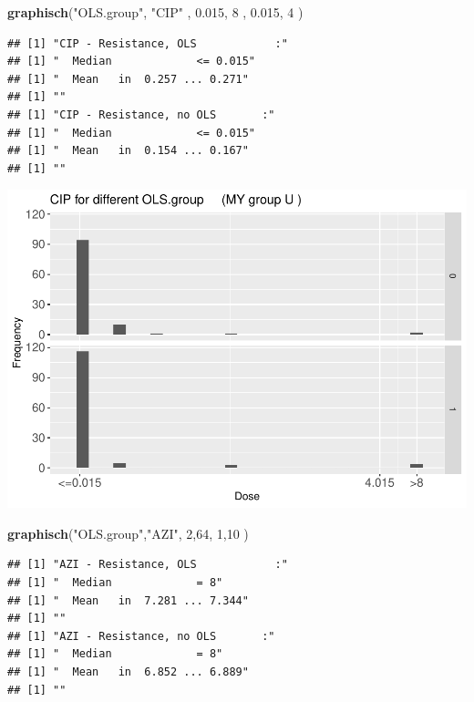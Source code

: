 \documentclass[
]{article}
\newenvironment{Shaded}{\begin{snugshade}}{\end{snugshade}}
\newcommand{\DecValTok}[1]{\textcolor[rgb]{0.00,0.00,0.81}{#1}}
\newcommand{\FloatTok}[1]{\textcolor[rgb]{0.00,0.00,0.81}{#1}}
\newcommand{\KeywordTok}[1]{\textcolor[rgb]{0.13,0.29,0.53}{\textbf{#1}}}
\newcommand{\NormalTok}[1]{#1}
\newcommand{\StringTok}[1]{\textcolor[rgb]{0.31,0.60,0.02}{#1}}
\begin{document}
\begin{Shaded}
\begin{Highlighting}[]
  \KeywordTok{graphisch}\NormalTok{(}\StringTok{"OLS.group"}\NormalTok{, }\StringTok{"CIP"}\NormalTok{ , }\FloatTok{0.015}\NormalTok{,   }\DecValTok{8}\NormalTok{   ,   }\FloatTok{0.015}\NormalTok{,   }\DecValTok{4}\NormalTok{     ) }
\end{Highlighting}
\end{Shaded}

\begin{verbatim}
## [1] "CIP - Resistance, OLS            :"
## [1] "  Median             <= 0.015"
## [1] "  Mean   in  0.257 ... 0.271"
## [1] ""
## [1] "CIP - Resistance, no OLS       :"
## [1] "  Median             <= 0.015"
## [1] "  Mean   in  0.154 ... 0.167"
## [1] ""
\end{verbatim}

\includegraphics{Verteilungen_files/figure-latex/unnamed-chunk-20-1.pdf}

\begin{Shaded}
\begin{Highlighting}[]
  \KeywordTok{graphisch}\NormalTok{(}\StringTok{"OLS.group"}\NormalTok{,}\StringTok{"AZI"}\NormalTok{, }\DecValTok{2}\NormalTok{,}\DecValTok{64}\NormalTok{, }\DecValTok{1}\NormalTok{,}\DecValTok{10}\NormalTok{    )}
\end{Highlighting}
\end{Shaded}

\begin{verbatim}
## [1] "AZI - Resistance, OLS            :"
## [1] "  Median             = 8"
## [1] "  Mean   in  7.281 ... 7.344"
## [1] ""
## [1] "AZI - Resistance, no OLS       :"
## [1] "  Median             = 8"
## [1] "  Mean   in  6.852 ... 6.889"
## [1] ""
\end{verbatim}
\end{document}
